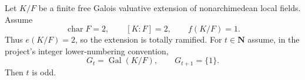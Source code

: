 \begin{theorem}\label{mod:cases-wildquadratic-equalcharacteristicbreak}
Let $K/F$ be a finite free Galois valuative extension of nonarchimedean
local fields.  Assume
\[
 \operatorname{char}F=2,\qquad [K:F]=2,\qquad f(K/F)=1.
\]
Thus $e(K/F)=2$, so the extension is totally ramified.  For $t\in\mathbf N$
assume, in the project's integer lower-numbering convention,
\[
 G_t=\operatorname{Gal}(K/F),\qquad G_{t+1}=\{1\}.
\]
Then $t$ is odd.
\leanok
{}
\FormalizationContract
\end{theorem}

